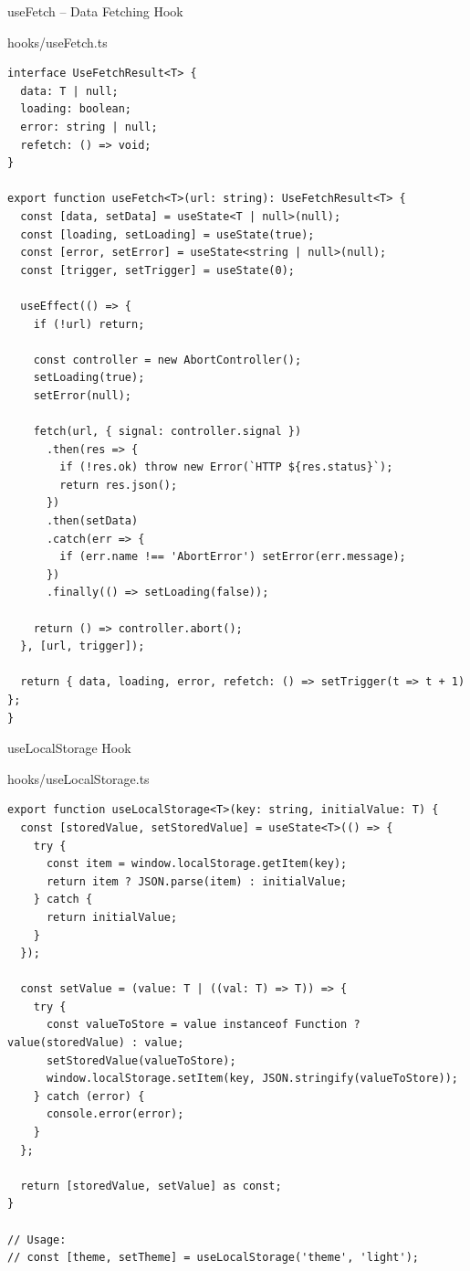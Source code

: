 \documentclass[12pt,a4paper]{article}
\begin{document}
\begin{compbox}{useFetch -- Data Fetching Hook}
\begin{codebox}{hooks/useFetch.ts}
\begin{lstlisting}
interface UseFetchResult<T> {
  data: T | null;
  loading: boolean;
  error: string | null;
  refetch: () => void;
}

export function useFetch<T>(url: string): UseFetchResult<T> {
  const [data, setData] = useState<T | null>(null);
  const [loading, setLoading] = useState(true);
  const [error, setError] = useState<string | null>(null);
  const [trigger, setTrigger] = useState(0);

  useEffect(() => {
    if (!url) return;

    const controller = new AbortController();
    setLoading(true);
    setError(null);

    fetch(url, { signal: controller.signal })
      .then(res => {
        if (!res.ok) throw new Error(`HTTP ${res.status}`);
        return res.json();
      })
      .then(setData)
      .catch(err => {
        if (err.name !== 'AbortError') setError(err.message);
      })
      .finally(() => setLoading(false));

    return () => controller.abort();
  }, [url, trigger]);

  return { data, loading, error, refetch: () => setTrigger(t => t + 1) };
}
\end{lstlisting}
\end{codebox}
\end{compbox}

\vspace{0.5cm}

\begin{compbox}{useLocalStorage Hook}
\begin{codebox}{hooks/useLocalStorage.ts}
\begin{lstlisting}
export function useLocalStorage<T>(key: string, initialValue: T) {
  const [storedValue, setStoredValue] = useState<T>(() => {
    try {
      const item = window.localStorage.getItem(key);
      return item ? JSON.parse(item) : initialValue;
    } catch {
      return initialValue;
    }
  });

  const setValue = (value: T | ((val: T) => T)) => {
    try {
      const valueToStore = value instanceof Function ? value(storedValue) : value;
      setStoredValue(valueToStore);
      window.localStorage.setItem(key, JSON.stringify(valueToStore));
    } catch (error) {
      console.error(error);
    }
  };

  return [storedValue, setValue] as const;
}

// Usage:
// const [theme, setTheme] = useLocalStorage('theme', 'light');
\end{lstlisting}
\end{codebox}
\end{compbox}
\end{document}
